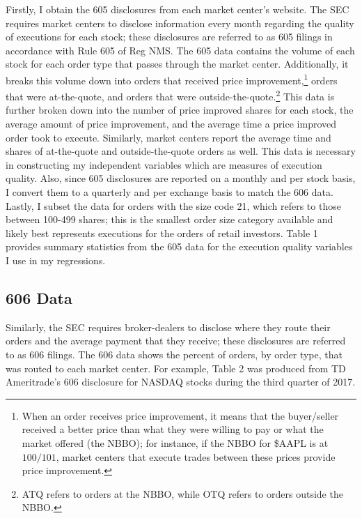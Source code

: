 \documentclass[12pt,a4paper]{article}
\begin{document}
				Firstly, I obtain the 605 disclosures from each market center's website. The SEC requires market centers to disclose information every month regarding the quality of executions for each stock; these disclosures are referred to as 605 filings in accordance with Rule 605 of Reg NMS. The 605 data contains the volume of each stock for each order type that passes through the market center. Additionally, it breaks this volume down into orders that received price improvement,\footnote{  When an order receives price improvement, it means that the buyer/seller received a better price than what they were willing to pay or what the market offered (the NBBO); for instance, if the NBBO for \$AAPL is at $100/101$, market centers that execute trades between these prices provide price improvement.} orders that were at-the-quote, and orders that were outside-the-quote.\footnote{  ATQ refers to orders at the NBBO, while OTQ refers to orders outside the NBBO.} This data is further broken down into the number of price improved shares for each stock, the average amount of price improvement, and the average time a price improved order took to execute. Similarly, market centers report the average time and shares of at-the-quote and outside-the-quote orders as well. This data is necessary in constructing my independent variables which are measures of execution quality. Also, since 605 disclosures are reported on a monthly and per stock basis, I convert them to a quarterly and per exchange basis to match the 606 data. Lastly, I subset the data for orders with the size code 21, which refers to those between 100-499 shares; this is the smallest order size category available and likely best represents executions for the orders of retail investors. Table 1 provides summary statistics from the 605 data for the execution quality variables I use in my regressions.
		
	\subsection{606 Data}
	
		Similarly, the SEC requires broker-dealers to disclose where they route their orders and the average payment that they receive; these disclosures are referred to as 606 filings. The 606 data shows the percent of orders, by order type, that was routed to each market center. For example, Table 2 was produced from TD Ameritrade's 606 disclosure for NASDAQ stocks during the third quarter of 2017. 
		
\end{document}
